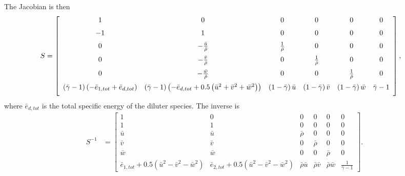 The Jacobian is then
\begin{align}
S &= 
\left[\begin{array}{cccccc}
    1      %
  & 0      %
  & 0      %
  & 0      %
  & 0      %
  & 0      %
  \\ \noalign{\medskip}
   -1      %
  & 1      %
  & 0      %
  & 0      %
  & 0      %
  & 0      %
  \\ \noalign{\medskip}
    0                                %
  & - \frac{\bar{u}}{\bar{\rho}}     %
  & \frac{1}{\bar{\rho}}             %
  & 0                                %
  & 0                                %
  & 0                                %
  \\ \noalign{\medskip}
    0                                %
  & - \frac{\bar{v}}{\bar{\rho}}     %
  & 0                                %
  & \frac{1}{\bar{\rho}}             %
  & 0                                %
  & 0                                %
  \\ \noalign{\medskip}
    0                                %
  & - \frac{\bar{w}}{\bar{\rho}}     %
  & 0                                %
  & 0                                %
  & \frac{1}{\bar{\rho}}             %
  & 0                                %
  \\ \noalign{\medskip}
    \left(\bar{\gamma} - 1\right) \left(-\bar{e}_{1,tot}+\bar{e}_{d,tot}\right) %
  & \left(\bar{\gamma} - 1\right) 
    \left(-\bar{e}_{d,tot} + 
    0.5 \left(\bar{u}^2 + \bar{v}^2 + \bar{w}^2\right)
    \right) %
  & \left(1 - \bar{\gamma}\right) \bar{u}       %
  & \left(1 - \bar{\gamma}\right) \bar{v}       %
  & \left(1 - \bar{\gamma}\right) \bar{w}       %
  & \bar{\gamma}-1                              %
  \\ \noalign{\medskip}
\end{array}\right]
,
\end{align}
%
where $\bar{e}_{d,tot}$ is the total specific energy of the diluter species.
The inverse is
\begin{align}
S^{-1} &= \left[\begin{array}{cccccc}
  1         & 0         & 0          & 0            & 0            & 0 \\
  1         & 1         & 0          & 0            & 0            & 0 \\
  \bar{u}   & \bar{u}   & \bar{\rho} & 0            & 0            & 0 \\
  \bar{v}   & \bar{v}   & 0          & \bar{\rho}   & 0            & 0 \\
  \bar{w}   & \bar{w}   & 0          & 0            & \bar{\rho}   & 0 \\
  \bar{e}_{1,tot} + 0.5 \left( \bar{u}^2 - \bar{v}^2 - \bar{w}^2\right)
& \bar{e}_{2,tot} + 0.5 \left( \bar{u}^2 - \bar{v}^2 - \bar{w}^2\right)
& \bar{\rho} \bar{u} 
& \bar{\rho} \bar{v} 
& \bar{\rho} \bar{w} 
& \frac{1}{\bar{\gamma}-1}
\end{array}\right]
.
\end{align}
